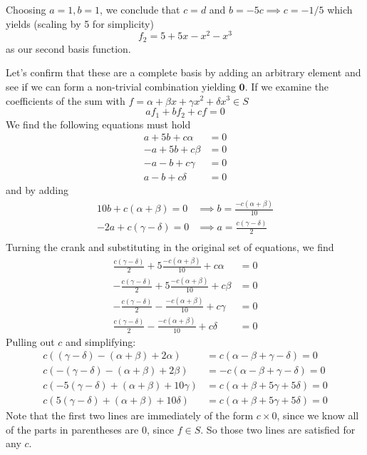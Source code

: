 \documentclass[]{article}
\begin{document}
\begin{enumerate}[resume]
\begin{enumerate}
        Choosing $a = 1, b = 1$, we conclude that $c = d$ and $b = -5c
        \implies c = -1/5$ which yields (scaling by 5 for simplicity)
        \[
        f_2 = 5 + 5x - x^2 - x^3
        \]
        as our second basis function.

        Let's confirm that these are a complete basis by adding an
        arbitrary element and see if we can form a non-trivial
        combination yielding $\bm{0}$. If we examine the coefficients
        of the sum with $f = \alpha + \beta x + \gamma x^2 + \delta
        x^3 \in S$
        \[
        a f_1 + b f_2 + c f = 0
        \]
        We find the following equations must hold
        \[\begin{split}
        a + 5b + c \alpha &= 0 \\
        -a + 5b + c \beta &= 0 \\
        -a - b + c \gamma &= 0 \\
         a - b + c \delta &= 0
        \end{split}\]
        and by adding
        \[\begin{split}
        10b + c(\alpha + \beta) = 0 &\implies b = \frac{-c(\alpha + \beta)}{10} \\
        -2a + c(\gamma - \delta) = 0 &\implies a = \frac{c(\gamma - \delta)}{2} \\
        \end{split}\]
        Turning the crank and substituting in the original set of
        equations, we find
        \[\begin{split}
        \frac{c(\gamma - \delta)}{2} + 5 \frac{-c(\alpha + \beta)}{10} + c \alpha &= 0 \\
        -\frac{c(\gamma - \delta)}{2} + 5 \frac{-c(\alpha + \beta)}{10} + c \beta &= 0 \\
        -\frac{c(\gamma - \delta)}{2} - \frac{-c(\alpha + \beta)}{10} + c \gamma &= 0 \\
        \frac{c(\gamma - \delta)}{2} - \frac{-c(\alpha + \beta)}{10} + c \delta &= 0
        \end{split}\]
        Pulling out $c$ and simplifying:
        \[\begin{split}
        c \left((\gamma - \delta) - (\alpha + \beta) + 2 \alpha\right) &= c \left(\alpha - \beta + \gamma - \delta\right) = 0 \\
        c\left(-(\gamma - \delta) -(\alpha + \beta) + 2 \beta\right) &= -c \left(\alpha - \beta + \gamma - \delta \right) = 0 \\
        c \left(-5(\gamma - \delta) + (\alpha + \beta) + 10 \gamma\right) &= c\left(\alpha + \beta + 5\gamma  + 5\delta\right) = 0 \\
        c\left(5(\gamma - \delta) + (\alpha + \beta) + 10 \delta\right) &= c(\alpha + \beta + 5 \gamma + 5 \delta) = 0
        \end{split}\]
        Note that the first two lines are immediately of the form $c
        \times 0$, since we know all of the parts in parentheses are
        0, since $f \in S$. So those two lines are satisfied for any $c$.


\end{enumerate}
\end{enumerate}
\end{document}
